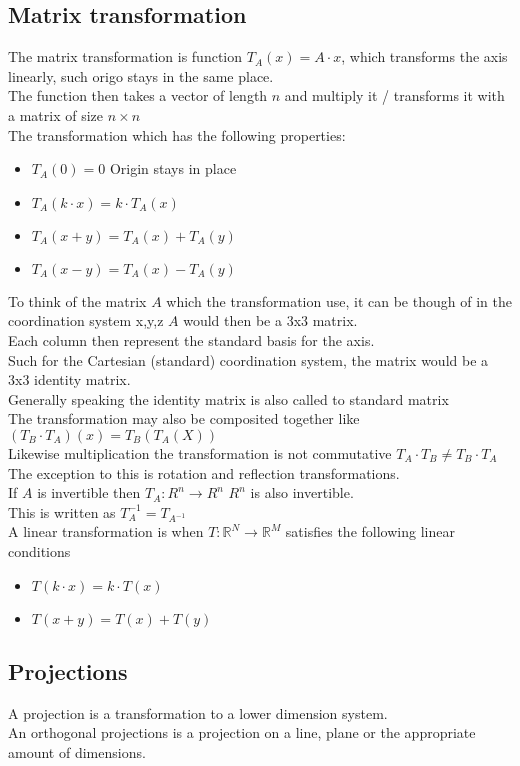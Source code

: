 \documentclass[12pt, a4paper]{article}
\begin{document}
		\subsection{Matrix transformation}
			The matrix transformation is function $T_A(x)=A\cdot x$, which transforms the axis linearly, such origo stays in the same place.\\
			The function then takes a vector of length $n$ and multiply it / transforms it with a matrix of size $n\times n$\\
			The transformation which has the following properties:
			\begin{itemize}
				\item $T_A(0)=0$ Origin stays in place
				\item $T_A(k\cdot x) = k\cdot T_A(x)$ 
				\item $T_A(x+y)=T_A(x)+T_A(y)$
				\item $T_A(x-y)=T_A(x)-T_A(y)$
			\end{itemize}
			To think of the matrix $A$ which the transformation use, it can be though of in the coordination system x,y,z $A$ would then be a 3x3 matrix.\\
			Each column then represent the standard basis for the axis. \\
			Such for the Cartesian (standard) coordination system, the matrix would be a 3x3 identity matrix.\\
			Generally speaking the identity matrix is also called to standard matrix\\[4mm]
			The transformation may also be composited together like $(T_B\cdot T_A)(x)=T_B(T_A(X))$\\
			Likewise multiplication the transformation is not commutative $T_A\cdot T_B\neq T_B \cdot T_A$\\
			The exception to this is rotation and reflection transformations.\\
			If $A$ is invertible then $T_A:R^n\rightarrow R^n$ $R^n$ is also invertible.\\
			This is written as $T_A^{-1}=T_{A^{-1}}$\\
			A linear transformation is when $T:\mathbb{R}^N\rightarrow\mathbb{R}^M$ satisfies the following linear conditions
			\begin{itemize}
				\item $T(k\cdot x) = k\cdot T(x)$
				\item $T(x+y)=T(x)+T(y)$
			\end{itemize}
		\subsection{Projections}
			A projection is a transformation to a lower dimension system.\\
			An orthogonal projections is a projection on a line, plane or the appropriate amount of dimensions.\\
\end{document}
